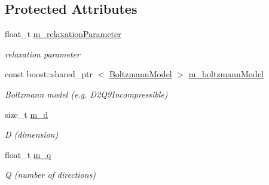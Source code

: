 \subsection*{\-Protected \-Attributes}
\begin{DoxyCompactItemize}
\item 
\hypertarget{classnatrium_1_1CollisionModel_a174b5a4c9a0ced236d1b522095f0b312}{float\-\_\-t \hyperlink{classnatrium_1_1CollisionModel_a174b5a4c9a0ced236d1b522095f0b312}{m\-\_\-relaxation\-Parameter}}\label{classnatrium_1_1CollisionModel_a174b5a4c9a0ced236d1b522095f0b312}

\begin{DoxyCompactList}\small\item\em relaxation parameter \end{DoxyCompactList}\item 
\hypertarget{classnatrium_1_1CollisionModel_a0c77cb3544948bb6d289ea8d47076012}{const boost\-::shared\-\_\-ptr\*
$<$ \hyperlink{classnatrium_1_1BoltzmannModel}{\-Boltzmann\-Model} $>$ \hyperlink{classnatrium_1_1CollisionModel_a0c77cb3544948bb6d289ea8d47076012}{m\-\_\-boltzmann\-Model}}\label{classnatrium_1_1CollisionModel_a0c77cb3544948bb6d289ea8d47076012}

\begin{DoxyCompactList}\small\item\em \-Boltzmann model (e.\-g. \-D2\-Q9\-Incompressible) \end{DoxyCompactList}\item 
\hypertarget{classnatrium_1_1CollisionModel_ad6dcd37d98c4a462286f41240a918b59}{size\-\_\-t \hyperlink{classnatrium_1_1CollisionModel_ad6dcd37d98c4a462286f41240a918b59}{m\-\_\-d}}\label{classnatrium_1_1CollisionModel_ad6dcd37d98c4a462286f41240a918b59}

\begin{DoxyCompactList}\small\item\em \-D (dimension) \end{DoxyCompactList}\item 
\hypertarget{classnatrium_1_1CollisionModel_a10c7648ea88f85687342044456003924}{float\-\_\-t \hyperlink{classnatrium_1_1CollisionModel_a10c7648ea88f85687342044456003924}{m\-\_\-q}}\label{classnatrium_1_1CollisionModel_a10c7648ea88f85687342044456003924}

\begin{DoxyCompactList}\small\item\em \-Q (number of directions) \end{DoxyCompactList}\end{DoxyCompactItemize}


